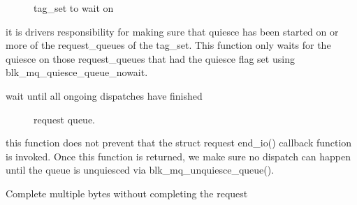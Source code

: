 \documentclass[a4paper,11pt,english]{sphinxmanual}
\begin{document}
\begin{description}
\item[{}] \leavevmode
tag\_set to wait on

\end{description}


it is driver\textquotesingle{}s responsibility for making sure that quiesce has
been started on or more of the request\_queues of the tag\_set.  This
function only waits for the quiesce on those request\_queues that had
the quiesce flag set using blk\_mq\_quiesce\_queue\_nowait.

\begin{fulllineitems}
\label{\detokenize{blk-mq:c.blk_mq_quiesce_queue}}
wait until all ongoing dispatches have finished

\end{fulllineitems}


\begin{description}
\item[{}] \leavevmode
request queue.

\end{description}


this function does not prevent that the struct request end\_io()
callback function is invoked. Once this function is returned, we make
sure no dispatch can happen until the queue is unquiesced via
blk\_mq\_unquiesce\_queue().

\begin{fulllineitems}
\label{\detokenize{blk-mq:c.blk_update_request}}
Complete multiple bytes without completing the request

\end{fulllineitems}
\end{document}
